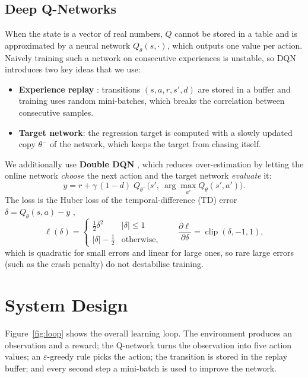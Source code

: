 \documentclass[11pt,a4paper]{article}
\begin{document}
\subsection{Deep Q-Networks}
When the state is a vector of real numbers, \(Q\) cannot be stored in a table and is approximated by a neural network \(Q_\theta(s,\cdot)\), which outputs one value per action.
Naively training such a network on consecutive experiences is unstable, so DQN \cite{mnih2015} introduces two key ideas that we use:
\begin{itemize}
  \item \textbf{Experience replay} \cite{lin1992}: transitions \((s,a,r,s',d)\) are stored in a buffer and training uses random mini-batches, which breaks the correlation between consecutive samples.
  \item \textbf{Target network}: the regression target is computed with a slowly updated copy \(\theta^-\) of the network, which keeps the target from chasing itself.
\end{itemize}
We additionally use \textbf{Double DQN} \cite{vanhasselt2016}, which reduces over-estimation by letting the online network \emph{choose} the next action and the target network \emph{evaluate} it:
\begin{equation}
  y = r + \gamma\,(1-d)\;Q_{\theta^-}\!\big(s',\ \arg\max_{a'}Q_{\theta}(s',a')\big).
  \label{eq:target}
\end{equation}
The loss is the Huber loss of the temporal-difference (TD) error \(\delta=Q_\theta(s,a)-y\) \cite{huber1964},
\begin{equation}
  \ell(\delta)=\begin{cases}\tfrac12\delta^{2}&|\delta|\le1\\ |\delta|-\tfrac12&\text{otherwise,}\end{cases}
  \qquad \frac{\partial\ell}{\partial\delta}=\operatorname{clip}(\delta,-1,1),
\end{equation}
which is quadratic for small errors and linear for large ones, so rare large errors (such as the crash penalty) do not destabilise training.

\section{System Design}
Figure~\ref{fig:loop} shows the overall learning loop.
The environment produces an observation and a reward; the Q-network turns the observation into five action values; an \(\varepsilon\)-greedy rule picks the action; the transition is stored in the replay buffer; and every second step a mini-batch is used to improve the network.
\end{document}
